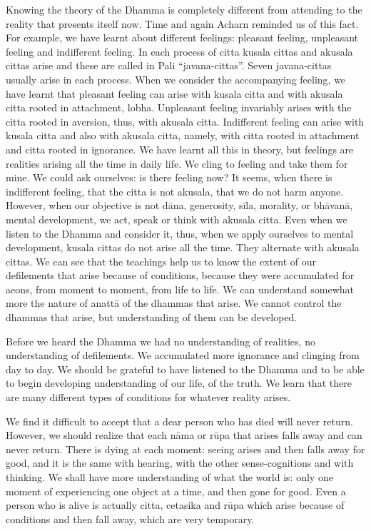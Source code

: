 Knowing the theory of the Dhamma is completely different from attending
to the reality that presents itself now. Time and again Acharn reminded
us of this fact. For example, we have learnt about different feelings:
pleasant feeling, unpleasant feeling and indifferent feeling. In each
process of citta kusala cittas and akusala cittas arise and these are
called in Pali ``javana-cittas''. Seven javana-cittas usually arise in
each process. When we consider the accompanying feeling, we have learnt
that pleasant feeling can arise with kusala citta and with akusala citta
rooted in attachment, lobha. Unpleasant feeling invariably arises with
the citta rooted in aversion, thus, with akusala citta. Indifferent
feeling can arise with kusala citta and also with akusala citta, namely,
with citta rooted in attachment and citta rooted in ignorance. We have
learnt all this in theory, but feelings are realities arising all the
time in daily life. We cling to feeling and take them for mine. We could
ask ourselves: is there feeling now? It seems, when there is indifferent
feeling, that the citta is not akusala, that we do not harm anyone.
However, when our objective is not dāna, generosity, sīla, morality, or
bhāvanā, mental development, we act, speak or think with akusala citta.
Even when we listen to the Dhamma and consider it, thus, when we apply
ourselves to mental development, kusala cittas do not arise all the
time. They alternate with akusala cittas. We can see that the teachings
help us to know the extent of our defilements that arise because of
conditions, because they were accumulated for aeons, from moment to
moment, from life to life. We can understand somewhat more the nature of
anattā of the dhammas that arise. We cannot control the dhammas that
arise, but understanding of them can be developed.

Before we heard the Dhamma we had no understanding of realities, no
understanding of defilements. We accumulated more ignorance and clinging
from day to day. We should be grateful to have listened to the Dhamma
and to be able to begin developing understanding of our life, of the
truth. We learn that there are many different types of conditions for
whatever reality arises.

We find it difficult to accept that a dear person who has died will
never return. However, we should realize that each nāma or rūpa that
arises falls away and can never return. There is dying at each moment:
seeing arises and then falls away for good, and it is the same with
hearing, with the other sense-cognitions and with thinking. We shall
have more understanding of what the world is: only one moment of
experiencing one object at a time, and then gone for good. Even a person
who is alive is actually citta, cetasika and rūpa which arise because of
conditions and then fall away, which are very temporary.

